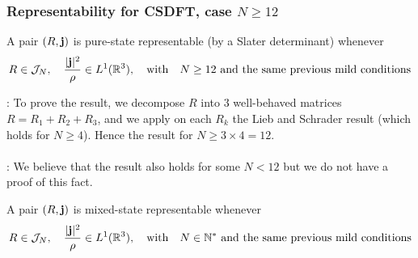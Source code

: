 \documentclass[9pt,xcolor=dvipsnames]{beamer}
\begin{document}
\begin{frame}

\frametitle{Representability for CSDFT, case $N \ge 12$}


\begin{theorem}[DG]
	A pair $(R, {\bold j})$ is pure-state representable (by a Slater determinant) whenever
		\[
		R \in {\mathcal J}_N, \quad
		\dfrac{| {\bold j} |^2}{\rho} \in L^1({\mathbb R}^3), 
		\quad \text{with} \quad
		\text{$N \ge 12$ and the same previous mild conditions}
	\]
\end{theorem}

: To prove the result, we decompose $R$ into $3$ well-behaved matrices $R = R_1 + R_2 + R_3$, and we apply on each $R_k$ the Lieb and Schrader result (which holds for $N \ge 4$). Hence the result for $N \ge 3 \times 4 = 12$. \\
~\\
: We believe that the result also holds for some $N < 12$ but we do not have a proof of this fact. %

\begin{corollary}
	A pair $(R, {\bold j})$ is mixed-state representable whenever
	\[
		R \in {\mathcal J}_N, \quad
		\dfrac{| {\bold j} |^2}{\rho} \in L^1({\mathbb R}^3), 
		\quad \text{with} \quad
		\text{$N \in {\mathbb N}^*$ and the same previous mild conditions}
	\]
\end{corollary}

\end{frame}

\end{document}
